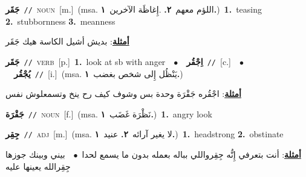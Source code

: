 \documentclass[10pt,a4paper,twoside]{article} %
\begin{document}
\begin{multicols}{2}
{\setlength\topsep{0pt}\textbf{\foreignlanguage{arabic}{جَقَر}}\ {\color{gray}\texttt{//}\color{black}}\ \textsc{noun}\ [m.]\ \color{gray}(msa. \foreignlanguage{arabic}{اللؤم معهم}~\foreignlanguage{arabic}{\textbf{٢.}}  .\foreignlanguage{arabic}{إِغاظَة الآخرين}~\foreignlanguage{arabic}{\textbf{١.}})\color{black}\ \textbf{1.}~teasing  \textbf{2.}~stubbornness  \textbf{3.}~meanness\  \begin{flushright}\color{gray}\foreignlanguage{arabic}{\textbf{\underline{\foreignlanguage{arabic}{أمثلة}}}: بديش أشيل الكاسة هيك جَقَر}\end{flushright}\color{black}} \vspace{2mm}

{\setlength\topsep{0pt}\textbf{\foreignlanguage{arabic}{جَقَر}}\ {\color{gray}\texttt{//}\color{black}}\ \textsc{verb}\ [p.]\ \textbf{1.}~look at sb with anger\ \ $\bullet$\ \ \setlength\topsep{0pt}\textbf{\foreignlanguage{arabic}{اِجْقُر}}\ {\color{gray}\texttt{//}\color{black}}\ [c.]\ \ $\bullet$\ \ \setlength\topsep{0pt}\textbf{\foreignlanguage{arabic}{يُجْقُر}}\ {\color{gray}\texttt{//}\color{black}}\ [i.]\ \color{gray}(msa. \foreignlanguage{arabic}{يَنْظُل إِلى شخص بغضب}~\foreignlanguage{arabic}{\textbf{١.}})\color{black}\  \begin{flushright}\color{gray}\foreignlanguage{arabic}{\textbf{\underline{\foreignlanguage{arabic}{أمثلة}}}: اجْقُره جَقْرَة وحدة بس وشوف كيف رح ينخ وتسمعلوش نفس}\end{flushright}\color{black}} \vspace{2mm}

{\setlength\topsep{0pt}\textbf{\foreignlanguage{arabic}{جَقْرَة}}\ {\color{gray}\texttt{//}\color{black}}\ \textsc{noun}\ [f.]\ \color{gray}(msa. \foreignlanguage{arabic}{نَظْرَة غَضَب}~\foreignlanguage{arabic}{\textbf{١.}})\color{black}\ \textbf{1.}~angry look\ } \vspace{2mm}

{\setlength\topsep{0pt}\textbf{\foreignlanguage{arabic}{جِقِر}}\ {\color{gray}\texttt{//}\color{black}}\ \textsc{adj}\ [m.]\ \color{gray}(msa. \foreignlanguage{arabic}{لا يغير آرائه}~\foreignlanguage{arabic}{\textbf{٢.}}  \foreignlanguage{arabic}{عنيد}~\foreignlanguage{arabic}{\textbf{١.}})\color{black}\ \textbf{1.}~headstrong  \textbf{2.}~obstinate\  \begin{flushright}\color{gray}\foreignlanguage{arabic}{\textbf{\underline{\foreignlanguage{arabic}{أمثلة}}}: أنت بتعرفي إِنُّه جِقِرواللي بباله بعمله بدون ما يسمع لحدا\ $\bullet$\ \  بيني وبينك جوزها جِقِرالله يعينها عليه}\end{flushright}\color{black}} \vspace{2mm}


\end{multicols}
\end{document}
